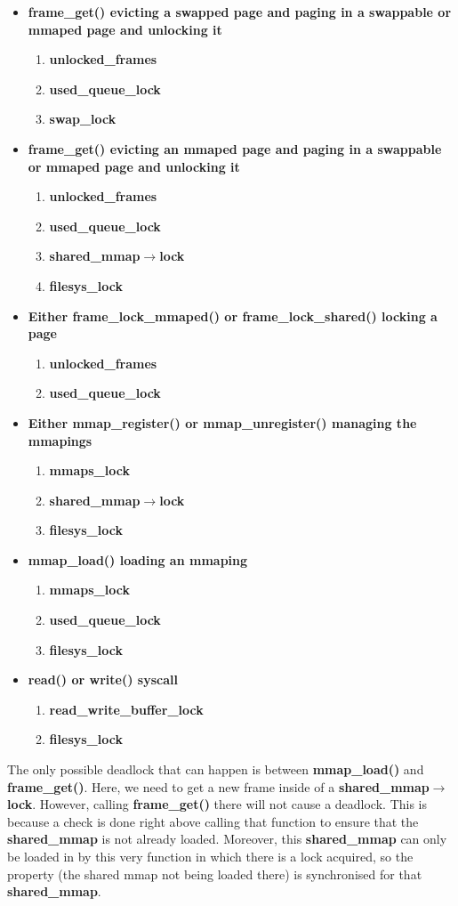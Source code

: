 \documentclass{report}
\newcommand{\bullpara}[2]{\item \textbf{#1} \ #2}
\newcommand{\fun}[1]{\textcolor{Emerald}{\textbf{#1}}}
\newcommand{\var}[1]{\textcolor{RoyalPurple}{\textbf{#1}}}
\newcommand{\compitem}[1]{\begin{itemize}\setlength\itemsep{-0.1em}#1\end{itemize}}
\newcommand{\compenum}[1]{\begin{enumerate}\setlength\itemsep{-0.1em}#1\end{enumerate}}
\begin{document}
				\compitem{
					\bullpara{\fun{frame\_get()} evicting a swapped page and paging in a swappable or mmaped page and unlocking it}{
						\compenum{
							\item \var{unlocked\_frames}
							\item \var{used\_queue\_lock}
							\item \var{swap\_lock}
						}
					}
					\bullpara{\fun{frame\_get()} evicting an mmaped page and paging in a swappable or mmaped page and unlocking it}{
						\compenum{
							\item \var{unlocked\_frames}
							\item \var{used\_queue\_lock}
							\item \var{shared\_mmap$\to$lock}
							\item \var{filesys\_lock}
						}
					}
					\bullpara{Either \fun{frame\_lock\_mmaped()} or \fun{frame\_lock\_shared()} locking a page}{
						\compenum{
							\item \var{unlocked\_frames}
							\item \var{used\_queue\_lock}
						}
					}
					\bullpara{Either \fun{mmap\_register()} or \fun{mmap\_unregister()} managing the mmapings}{
						\compenum{
							\item \var{mmaps\_lock}
							\item \var{shared\_mmap$\to$lock}
							\item \var{filesys\_lock}
						}
					}
					\bullpara{\fun{mmap\_load()} loading an mmaping}{
						\compenum{
							\item \var{mmaps\_lock}
							\item \var{used\_queue\_lock}
							\item \var{filesys\_lock}
						}
					}
					\bullpara{\fun{read()} or \fun{write()} syscall}{
						\compenum{
							\item \var{read\_write\_buffer\_lock}
							\item \var{filesys\_lock}
						}
					}
				}
				The only possible deadlock that can happen is between \fun{mmap\_load()} and \fun{frame\_get()}.
				Here, we need to get a new frame inside of a \var{shared\_mmap$\to$lock}. 
				However, calling \fun{frame\_get()} there will not cause a
				deadlock. This is because a check is done right above calling that function to ensure that the \var{shared\_mmap} is not
				already loaded. Moreover, this \var{shared\_mmap} can only be loaded in by this very function in which there
				is a lock acquired, so the property (the shared mmap not being loaded there) is synchronised for that \var{shared\_mmap}.
\end{document}
